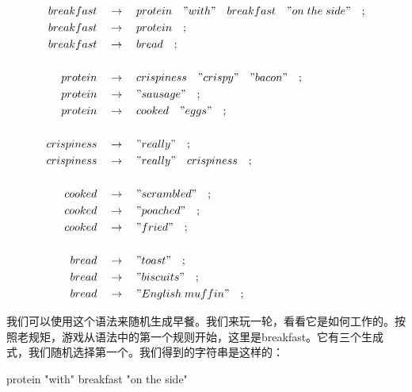 \documentclass[cn,11pt,chinese]{elegantbook}
\begin{document}
\begin{tcolorbox}
\begin{equation*}
\begin{split}
breakfast \quad & \rightarrow \quad protein \quad \mathtt{"}with\mathtt{"} \quad breakfast \quad \mathtt{"}on \; the \; side\mathtt{"} \quad ; \\
breakfast \quad & \rightarrow \quad protein \quad ; \\
breakfast \quad & \rightarrow \quad bread \quad ; \\
\\
protein  \quad & \rightarrow \quad crispiness \quad \mathtt{"}crispy\mathtt{"} \quad \mathtt{"}bacon\mathtt{"} \quad ; \\
protein  \quad & \rightarrow \quad \mathtt{"}sausage\mathtt{"} \quad ; \\
protein  \quad & \rightarrow \quad cooked \quad \mathtt{"}eggs\mathtt{"} \quad ; \\
\\
crispiness \quad & \rightarrow \quad \mathtt{"}really\mathtt{"} \quad ; \\
crispiness \quad & \rightarrow \quad \mathtt{"}really\mathtt{"} \quad crispiness \quad ; \\
\\
cooked \quad & \rightarrow \quad \mathtt{"}scrambled\mathtt{"} \quad ; \\
cooked \quad & \rightarrow \quad \mathtt{"}poached\mathtt{"} \quad ; \\
cooked \quad & \rightarrow \quad \mathtt{"}fried\mathtt{"} \quad ; \\
\\
bread \quad & \rightarrow \quad \mathtt{"}toast\mathtt{"} \quad; \\
bread \quad & \rightarrow \quad \mathtt{"}biscuits\mathtt{"} \quad ; \\
bread \quad & \rightarrow \quad \mathtt{"}English \; muffin\mathtt{"} \quad ;
\end{split}
\end{equation*}
\end{tcolorbox}

我们可以使用这个语法来随机生成早餐。我们来玩一轮，看看它是如何工作的。按照老规矩，游戏从语法中的第一个规则开始，这里是breakfast。它有三个生成式，我们随机选择第一个。我们得到的字符串是这样的：

\begin{tcolorbox}
protein "with" breakfast "on the side"
\end{tcolorbox}
\end{document}
